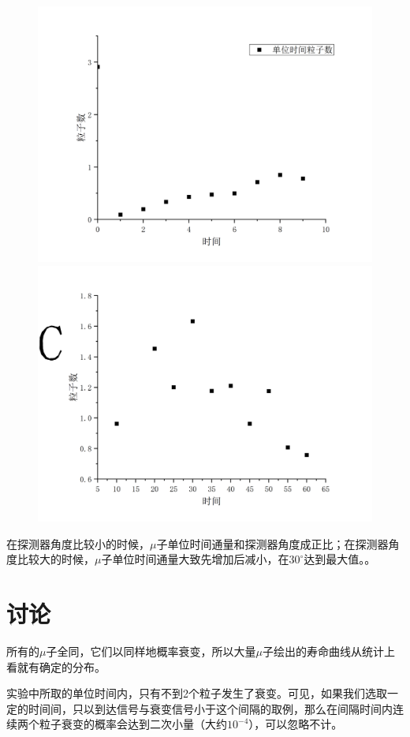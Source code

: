 \documentclass[hyperref]{ctexart}
\begin{document}
	\begin{figure}[H]
	\begin{minipage}{0.5\linewidth}
	\includegraphics[scale=0.3]{t11}
	\end{minipage}
	\begin{minipage}{0.25\linewidth}
	\includegraphics[scale=0.3]{t12}
	\end{minipage}
	\end{figure}

	在探测器角度比较小的时候，$\mu$子单位时间通量和探测器角度成正比；在探测器角度比较大的时候，$\mu$子单位时间通量大致先增加后减小，在$30^{\circ}$达到最大值。。






	\section{讨论}
	所有的$\mu$子全同，它们以同样地概率衰变，所以大量$\mu$子绘出的寿命曲线从统计上看就有确定的分布。
	
	实验中所取的单位时间内，只有不到2个粒子发生了衰变。可见，如果我们选取一定的时间间，只以到达信号与衰变信号小于这个间隔的取例，那么在间隔时间内连续两个粒子衰变的概率会达到二次小量（大约$10^{-4}$），可以忽略不计。






\end{document}
